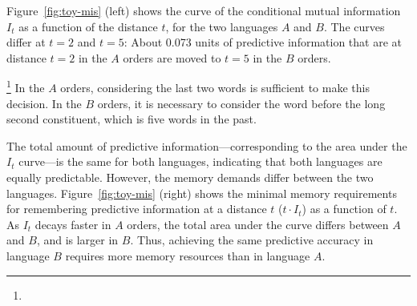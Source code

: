 Figure~\ref{fig:toy-mis} (left) shows the curve of the conditional mutual information $I_t$ as a function of the distance $t$, for the two languages $A$ and $B$. 
The curves differ at $t=2$ and $t=5$: 
About 0.073 units of predictive information that are at distance $t=2$ in the $A$ orders are moved to $t=5$ in the $B$ orders.


\footnote{}
In the $A$ orders, considering the last two words is sufficient to make this decision.
In the $B$ orders, it is necessary to consider the word before the long second constituent, which is five words in the past.

The total amount of predictive information---corresponding to the area under the $I_t$ curve---is the same for both languages, indicating that both languages are equally predictable. However, the memory demands differ between the two languages. Figure~\ref{fig:toy-mis} (right) shows the minimal memory requirements for remembering predictive information at a distance $t$ ($t\cdot I_t$) as a function of $t$. As $I_t$ decays faster in $A$ orders, the total area under the curve differs between $A$ and $B$, and is larger in $B$. Thus, achieving the same predictive accuracy in language $B$ requires more memory resources than in language $A$.



